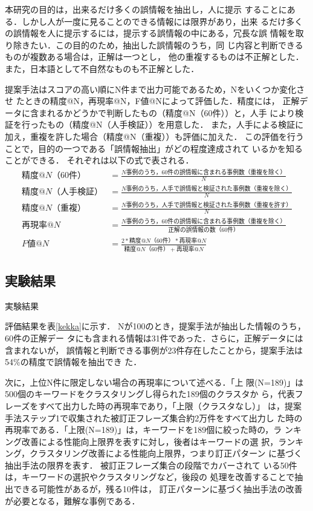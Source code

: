 \documentclass[japanese]{jnlp_1.4}
\begin{document}
本研究の目的は，出来るだけ多くの誤情報を抽出し，人に提示
することにある．しかし人が一度に見ることのできる情報には限界があり，出来
るだけ多くの誤情報を人に提示するには，提示する誤情報の中にある，冗長な誤
情報を取り除きたい．この目的のため，抽出した誤情報のうち，同
じ内容と判断できるものが複数ある場合は，正解は一つとし，
他の重複するものは不正解とした．
また，日本語として不自然なものも不正解とした．

提案手法はスコアの高い順にN件まで出力可能であるため，Nをいくつか変化させ
たときの精度@N，再現率@N，F値@Nによって評価した．精度には，
正解データに含まれるかどうかで判断したもの（精度@N（60件））と，人手
により検証を行ったもの（精度@N（人手検証））を用意した．
また，人手による検証に加え，重複を許した場合（精度@N（重複））も評価に加えた．
この評価を行うことで，目的の一つである「誤情報抽出」がどの程度達成されて
いるかを知ることができる．
それぞれは以下の式で表される．
\begin{align}
 精度@N（60件） & = \frac{N事例のうち，60件の誤情報に含まれる事例数（重複を除く）}{N}  \\[1zw]
 精度@N（人手検証） & = \frac{N事例のうち，人手で誤情報と検証された事例数（重複を除く）}{N} \\[1zw]
 精度@N（重複） & = \frac{N事例のうち，人手で誤情報と検証された事例数（重複を許す）}{N}  \\[1zw]
 再現率@N & = \frac{N事例のうち，60件の誤情報に含まれる事例数（重複を除く）}{正解の誤情報の数（60件）} \\[1zw]
 F値@N & = \frac{2*精度@N（60件） * 再現率@N}{精度@N（60件） + 再現率@N} 
\end{align}



\subsection{実験結果}

\begin{table}[b]
\vspace{-1\Cvs}
 \caption[評価]{実験結果}
 \label{kekka}

\end{table}

評価結果を表\ref{kekka}に示す．
\pagebreak
Nが100のとき，提案手法が抽出した情報のうち，60件の正解デー
タにも含まれる情報は31件であった．さらに，正解データには含まれないが，
誤情報と判断できる事例が23件存在したことから，提案手法は54\%の精度で誤情報を抽出でき
た．

次に，上位N件に限定しない場合の再現率について述べる．「上
限(N=189)」は500個のキーワードをクラスタリングし得られた189個のクラスタか
ら，代表フレーズをすべて出力した時の再現率であり，「上限（クラスタなし）」
は，提案手法ステップ1で収集された被訂正フレーズ集合約2万件をすべて出力し
た時の再現率である．「上限(N=189)」は，キーワードを189個に絞った時の，ラ
ンキング改善による性能向上限界を表すに対し，後者はキーワードの選
択，ランキング，クラスタリング改善による性能向上限界，つまり訂正パターン
に基づく抽出手法の限界を表す．
被訂正フレーズ集合の段階でカバーされて
いる50件は，キーワードの選択やクラスタリングなど，後段の
処理を改善することで抽出できる可能性があるが，残る10件は，
訂正パターンに基づく抽出手法の改善が必要となる，難解な事例である．
\end{document}
